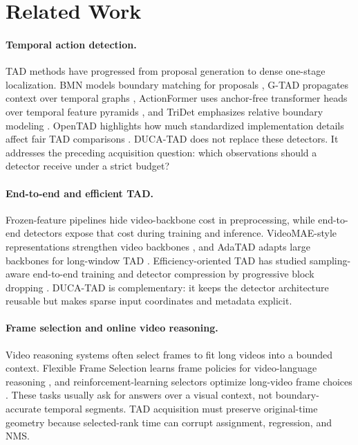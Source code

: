 \section{Related Work}

\paragraph{Temporal action detection.}
TAD methods have progressed from proposal generation to dense one-stage localization. BMN models boundary matching for proposals \citep{lin2019bmn}, G-TAD propagates context over temporal graphs \citep{xu2020gtad}, ActionFormer uses anchor-free transformer heads over temporal feature pyramids \citep{zhang2022actionformer}, and TriDet emphasizes relative boundary modeling \citep{shi2023tridet}. OpenTAD highlights how much standardized implementation details affect fair TAD comparisons \citep{liu2025opentad}. DUCA-TAD does not replace these detectors. It addresses the preceding acquisition question: which observations should a detector receive under a strict budget?

\paragraph{End-to-end and efficient TAD.}
Frozen-feature pipelines hide video-backbone cost in preprocessing, while end-to-end detectors expose that cost during training and inference. VideoMAE-style representations strengthen video backbones \citep{tong2022videomae}, and AdaTAD adapts large backbones for long-window TAD \citep{liu2024adatad}. Efficiency-oriented TAD has studied sampling-aware end-to-end training \citep{liu2023etad} and detector compression by progressive block dropping \citep{chen2025progressiveblockdrop}. DUCA-TAD is complementary: it keeps the detector architecture reusable but makes sparse input coordinates and metadata explicit.

\paragraph{Frame selection and online video reasoning.}
Video reasoning systems often select frames to fit long videos into a bounded context. Flexible Frame Selection learns frame policies for video-language reasoning \citep{buch2025flexible}, and reinforcement-learning selectors optimize long-video frame choices \citep{qin2026efficientframe}. These tasks usually ask for answers over a visual context, not boundary-accurate temporal segments. TAD acquisition must preserve original-time geometry because selected-rank time can corrupt assignment, regression, and NMS.

